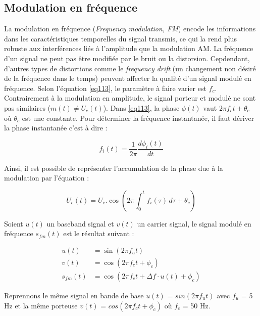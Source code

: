 \subsection{Modulation en fréquence}

La modulation en fréquence (\textit{Frequency modulation, FM}) encode les informations dans les caractéristiques temporelles du signal transmis, ce qui la rend plus robuste aux interférences liés à l'amplitude que la modulation AM. La fréquence d'un signal ne peut pas être modifiée par le bruit ou la distorsion. Cepdendant, d'autres types de distortions comme le \textit{frequency drift} (un changement non désiré de la fréquence dans le temps) peuvent affecter la qualité d'un signal modulé en fréquence. Selon l'équation \ref{eq113}, le paramètre à faire varier est $f_c$. Contrairement à la modulation en amplitude, le signal porteur et modulé ne sont pas similaires ($m(t) \neq U_c(t)$). Dans \ref{eq113}, la phase $\phi(t)$ vaut $2 \pi f_ct + \theta_c$ où $\theta_c$ est une constante. Pour déterminer la fréquence instantanée, il faut dériver la phase instantanée c'est à dire :

\begin{equation}\label{eq120}
f_i(t) = \frac{1}{2\pi} \frac{d\phi_i(t)}{dt}
\end{equation}

Ainsi, il est possible de représenter l'accumulation de la phase due à la modulation par l'équation :

\begin{equation}\label{eq121}
U_c(t) = U_c.\cos(2 \pi \int_{0}^{t} f_i(\tau) \, d\tau +  \theta_c)
\end{equation}

\vspace{0.1cm}

Soient $u(t)$ un baseband signal et $v(t)$ un carrier signal, le signal modulé en fréquence $s_{fm}(t)$ est le résultat suivant :

\begin{align}
    u(t) &= \sin(2\pi f_{u}t) \\
    v(t) &= \cos(2\pi f_{c}t + \phi_{c}) \\
    s_{fm}(t) &= \cos\left(2\pi f_{c}t + \Delta f \cdot u(t) + \phi_{c}\right)
\end{align}

\vspace{0.1cm}

Reprennons le même signal en bande de base 
$u(t)$ = $sin(2\pi f_{u}t)$ avec $f_{u}$ = 5 Hz et la même porteuse 
$v(t)$ = $cos(2\pi f_{c}t + \phi_{c})$ où $f_{c}$ = 50 Hz.

